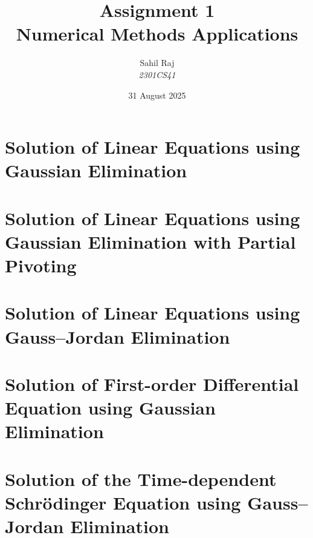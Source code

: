 \documentclass[12pt,a4paper]{report}
\title{\textbf{Assignment 1}\\Numerical Methods Applications}
\author{Sahil Raj\\\textit{2301CS41}}
\date{31 August 2025}
\begin{document}
\maketitle
\tableofcontents
\clearpage

\chapter{Solution of Linear Equations using Gaussian Elimination}


\chapter{Solution of Linear Equations using Gaussian Elimination with Partial Pivoting}


\chapter{Solution of Linear Equations using Gauss--Jordan Elimination}


\chapter{Solution of First-order Differential Equation using Gaussian Elimination}


\chapter{Solution of the Time-dependent Schrödinger Equation using Gauss--Jordan Elimination}

\end{document}
